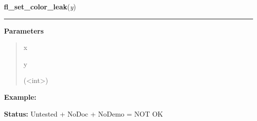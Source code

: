 \hspace{.8\funcindent}\begin{boxedminipage}{\funcwidth}

    \raggedright \textbf{fl\_set\_color\_leak}(\textit{y})

    \vspace{-1.5ex}

    \rule{\textwidth}{0.5\fboxrule}
\setlength{\parskip}{2ex}
\setlength{\parskip}{1ex}
      \textbf{Parameters}
      \vspace{-1ex}

      \begin{quote}
        \begin{Ventry}{x}

          \item[y]

          ({\textless}int{\textgreater})

        \end{Ventry}

      \end{quote}

\textbf{Example:} 

\textbf{Status:} Untested + NoDoc + NoDemo = NOT OK



    \end{boxedminipage}

    \label{xformslib:library:fl_getmcolor}

    \vspace{0.5ex}


